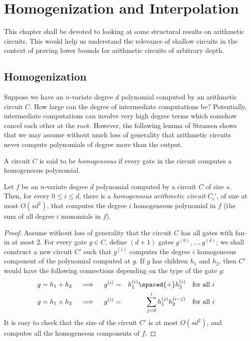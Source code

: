 \chapter{Homogenization and Interpolation}\label{chap:homogenisation-and-interpolation}

This chapter shall be devoted to looking at some structural results on arithmetic circuits. 
This would help us understand the relevance of shallow circuits in the context of proving lower bounds for arithmetic circuits of arbitrary depth. 

\section{Homogenization}\label{sec:homogenization}

Suppose we have an $n$-variate degree $d$ polynomial computed by an arithmetic circuit $C$. 
How large can the degree of intermediate computations be? 
Potentially, intermediate computations can involve very high degree terms which somehow cancel each other at the root. 
However, the following lemma of Strassen shows that we may assume without much loss of generality that arithmetic circuits never compute polynomials of degree more than the output. 

\begin{definition}
A circuit $C$ is said to be \emph{homogeneous} if every gate in the circuit computes a homogeneous polynomial. 
\end{definition}

\begin{lemma}[Homogenization]\label{lem:homogenization}
Let $f$ be an $n$-variate degree $d$ polynomial computed by a circuit $C$ of size $s$. 
Then, for every $0\leq i \leq d$, there is a \emph{homogeneous arithmetic circuit} $C_i'$, of size at most $O(sd^2)$, that computes the degree $i$ homogeneous polynomial in $f$ (the sum of all degree $i$ monomials in $f$).  
\end{lemma}
\begin{proof}
Assume without loss of generality that the circuit $C$ has all gates with fan-in at most $2$. 
For every gate $g\in C$, define $(d+1)$ gates $g^{(0)},\dots, g^{(d)}$; we shall construct a new circuit $C'$ such that $g^{(i)}$ computes the degree $i$ homogeneous component of the polynomial computed at $g$. 
If $g$ has children $h_1$ and $h_2$, then $C'$ would have the following connections depending on the type of the gate $g$:
\begin{eqnarray*}
\text{$g = h_1 + h_2$}\quad\implies\quad g^{(i)} &=& h_1^{(i)} \spaced{+} h_2^{(i)}\quad\text{for all $i$}\\
\text{$g = h_1 \times h_2$}\quad\implies\quad g^{(i)} &=& \sum_{j=0}^i h_1^{(j)} h_2^{(i-j)}\quad\text{for all $i$}
\end{eqnarray*}
It is easy to check that the size of the circuit $C'$ is at most $O(sd^2)$, and computes all the homogeneous components of $f$. 
\end{proof}

